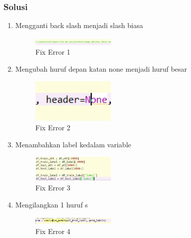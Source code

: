         \subsubsection{Solusi}
            \begin{enumerate}
                \item Mengganti back slash menjadi slash biasa
                \begin{figure}[H]
                    \includegraphics[width=4cm]{figures/1174040/chapter3/fixerr1.png}
                    \centering
                    \caption{Fix Error 1}
                    \end{figure}
                \item Mengubah huruf depan katan none menjadi huruf besar
                \begin{figure}[H]
                    \includegraphics[width=4cm]{figures/1174040/chapter3/fixerr2.png}
                    \centering
                    \caption{Fix Error 2}
                    \end{figure}
                \item Menambahkan label kedalam variable
                \begin{figure}[H]
                    \includegraphics[width=4cm]{figures/1174040/chapter3/fixerr3.png}
                    \centering
                    \caption{Fix Error 3}
                    \end{figure}
                \item Mengilangkan 1 huruf s
                \begin{figure}[H]
                    \includegraphics[width=4cm]{figures/1174040/chapter3/fixerr4.png}
                    \centering
                    \caption{Fix Error 4}
                    \end{figure}
            \end{enumerate}